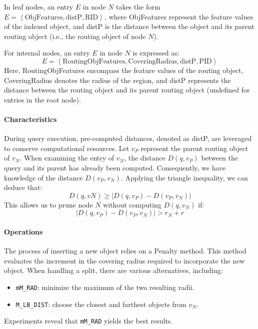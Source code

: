 In leaf nodes, an entry $E$ in node $N$ takes the form $E=\left\langle \text{ObjFeatures}, \text{distP}, \text{RID} \right\rangle $, where ObjFeatures represent the feature values of the indexed object, and distP is the distance between the object and its parent routing object (i.e., the routing object of node $N$).

For internal nodes, an entry $E$ in node $N$ is expressed as:
\[E=\left\langle \text{RoutingObjFeatures}, \text{CoveringRadius}, \text{distP}, \text{PID} \right\rangle \]
Here, RoutingObjFeatures encompass the feature values of the routing object, CoveringRadius denotes the radius of the region, and distP represents the distance between the routing object and its parent routing object (undefined for entries in the root node).

\paragraph*{Characteristics}
During query execution, pre-computed distances, denoted as distP, are leveraged to conserve computational resources.
Let $v_P$ represent the parent routing object of $v_N$.
When examining the entry of $v_N$, the distance $D(q,v_P)$ between the query and its parent has already been computed. 
Consequently, we have knowledge of the distance $D(v_P,v_N)$.
Applying the triangle inequality, we can deduce that:
\[D(q,vN) \geq \left\lvert  D(q,v_P) - D(v_P,v_N)\right\rvert\]
This allows us to prune node $N$ without computing $D(q,v_N)$ if:
\[\left\lvert D(q,v_P) - D(v_P,v_N)\right\rvert > r_N + r\]

\paragraph*{Operations}
The process of inserting a new object relies on a Penalty method. 
This method evaluates the increment in the covering radius required to incorporate the new object. 
When handling a split, there are various alternatives, including:
\begin{itemize}
    \item \texttt{mM\_RAD}: minimize the maximum of the two resulting radii.
    \item \texttt{M\_LB\_DIST}: choose the closest and farthest objects from $v_N$.
\end{itemize}
Experiments reveal that \texttt{mM\_RAD} yields the best results.